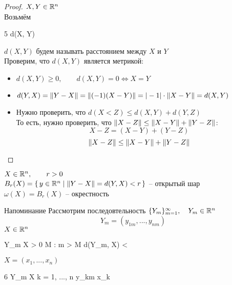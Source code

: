 \begin{proof}
	$ X, Y \in \mathbb{R}^n $ \\
	Возьмём
	\begin{equ}5
		d(X, Y)  {}
	\end{equ}
	$ d(X, Y) $ будем называть расстоянием между $ X $ и $ Y $ \\
	Проверим, что $ d(X, Y) $ является метрикой:
	\begin{itemize}
		\item $ d(X, Y) \ge 0, \qquad d(X, Y) = 0 \iff X = Y $
		\item $ d(Y, X) = \left\|{Y - X}\right\| = \left\|{(-1)(X - Y)}\right\| = |-1| \cdot \left\|{X - Y}\right\| = d(X, Y) $
		\item Нужно проверить, что $ d(X< Z) \le d(X, Y) + d(Y, Z) $ \\
		То есть, нужно проверить, что $ \left\|{X - Z}\right\| \le \left\|{X - Y}\right\| + \left\|{Y - Z}\right\| $:
		$$ X - Z = (X - Y) + (Y - Z) $$
		$$ \left\|{X - Z}\right\| \le \left\|{X - Y}\right\| + \left\|{Y - Z}\right\| $$
	\end{itemize}
\end{proof}

\begin{definition}
	$ X \in \mathbb{R}^n, \qquad r > 0 $ \\
	$ B_r(X) = \set{y \in \ensuremath{\mathbb{R}}^n | \ensuremath{\left\|{Y - X}\right\|} = d(Y, X) < r} $ -- открытый шар \\
	$ \omega(X) = B_r(X) $ -- окрестность
\end{definition}

\begin{undefthm}{Напоминание}
	Рассмотрим последовтельность $ \{Y_m\}_{m=1}^{\infty}, \quad Y_m \in \mathbb{R}^n $
	$$ Y_m = (y_{1m}, ..., y_{nm}) $$
	$ X \in \mathbb{R}^n $
	\begin{equ}{55}
		Y_m  X \iff \forall \veps > 0 \quad \exist M : \forall m > M \quad d(Y_m, X) < \veps
	\end{equ}
\end{undefthm}

$ X = (x_1, ..., x_n) $

\begin{statement}
	\begin{equ}6
		Y_m  X \iff \forall k = 1, ..., n \quad y_{km} \underarr{n \to \infty} x_k
	\end{equ}
\end{statement}

